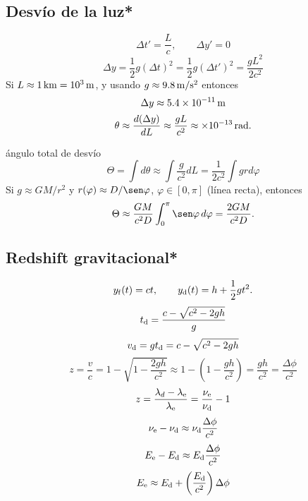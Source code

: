 \subsection{Desvío de la luz*}
\begin{equation}
\Delta t'=\frac{L}{c}, \qquad \Delta y' = 0
\end{equation}
\begin{equation}
\Delta y = \frac{1}{2} g (\Delta t)^2 = \frac{1}{2} g (\Delta t')^2 = \frac{gL^2}{2c^2}
\end{equation}
Si $L\approx 1{\,\rm km} = 10^3{\,\rm m}$, y usando $g\approx 9.8{\,\rm m/s^2}$ entonces
\begin{equation}
\Delta y \approx 5.4\times 10^{-11}{\,\rm m}
\end{equation}
\begin{equation}
\theta \approx \frac{d(\Delta y)}{dL} \approx \frac{gL}{c^2} \approx \times 10^{-13}{\,\rm rad}.
\end{equation}

ángulo total de desvío
\begin{equation}
\Theta = \int d\theta \approx \int \frac{g}{c^2}dL = \frac{1}{2c^2}\int g r d\varphi
\end{equation}
Si $g\approx GM/r^2$ y $r(\varphi)\approx D/\sen\varphi$, $\varphi\in [0,\pi]$ (línea recta), entonces
\begin{equation}
\Theta \approx \frac{GM}{c^2D}\int_0^\pi\sen\varphi\,d\varphi = \frac{2GM}{c^2D}.
\end{equation}

\subsection{Redshift gravitacional*}
 
 \begin{equation}
 y_{\rm f}(t) = ct, \qquad y_{\rm d}(t)=h+\frac{1}{2}gt^2.
 \end{equation}
 \begin{equation}
t_{\rm d} = \frac{c-\sqrt{c^2-2gh}}{g}
 \end{equation}
 \begin{equation}
 v_{\rm d}=gt_{\rm d} = c-\sqrt{c^2-2gh}
 \end{equation}
 \begin{equation}
 z=\frac{v}{c}=1-\sqrt{1-\frac{2gh}{c^2}} \approx 1-\left(1-\frac{gh}{c^2}\right) = \frac{gh}{c^2} = \frac{\Delta\phi}{c^2}
 \end{equation}
 \begin{equation}
z = \frac{\lambda_{d}-\lambda_{\rm e}}{\lambda_{\rm e}} = \frac{\nu_{\rm e}}{\nu_{\rm d}}-1
 \end{equation}
 \begin{equation}
 \nu_{\rm e}-\nu_{\rm d} \approx \nu_{\rm d}\frac{\Delta\phi}{c^2}
 \end{equation}
  \begin{equation}
 E_{\rm e}-E_{\rm d} \approx E_{\rm d}\frac{\Delta\phi}{c^2}
 \end{equation}
   \begin{equation}
 E_{\rm e} \approx E_{\rm d} + \left(\frac{E_{\rm d}}{c^2}\right)\Delta\phi
 \end{equation}

